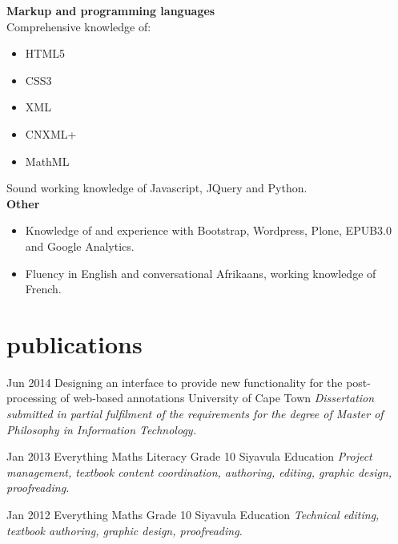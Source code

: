 \documentclass[]{friggeri-cv} %
\begin{document}
\textbf{Markup and programming languages}\\

Comprehensive knowledge of: 
\begin{itemize}
 \item HTML5
 \item CSS3
 \item XML
 \item CNXML+
 \item MathML
 \end{itemize}
Sound working knowledge of Javascript, JQuery and Python.\\

\textbf{Other}
\begin{itemize}
\item Knowledge of and experience with Bootstrap, Wordpress, Plone, EPUB3.0 and Google Analytics.
 \item Fluency in English and conversational Afrikaans, working knowledge of French.\\
 
\end{itemize}

\section{publications}
\begin{entrylist}
\entry
{Jun 2014}
{Designing an interface to provide new
functionality for the post-processing of
web-based annotations}
{University of Cape Town}
{\emph{
Dissertation submitted in partial fulfilment of the requirements
for the degree of Master of Philosophy in Information Technology.} 
 }



\entry
{Jan 2013}
{Everything Maths Literacy Grade 10}
{Siyavula Education}
{\emph{Project management, textbook content coordination, authoring, editing, graphic design, proofreading.}}

\entry
{Jan 2012}
{Everything Maths Grade 10}
{Siyavula Education}
{\emph{Technical editing, textbook authoring, graphic design, proofreading.}}

\end{entrylist}
\end{document}
